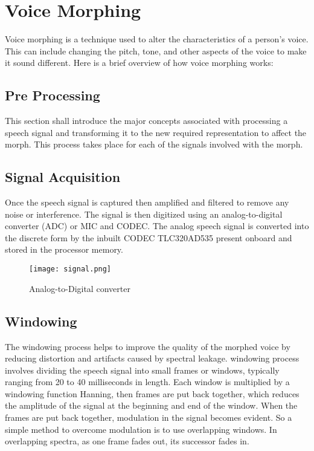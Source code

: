 \documentclass[12pt]{report}
\begin{document}
\section{Voice Morphing}
Voice morphing is a technique used to alter the characteristics of a person's voice. This can include 
changing the pitch, tone, and other aspects of the voice to make it sound different. Here is a brief overview of how voice morphing works:

\subsection{ Pre Processing}
This  section  shall  introduce  the  major  concepts  associated  with  processing  a  speech  signal  and transforming it to the new required representation to affect the morph. This process takes place for each of the signals involved with the morph.
\newline

\subsection{ Signal Acquisition}

Once the speech signal is captured then  amplified and filtered to remove any noise or interference. The signal is then digitized using an analog-to-digital converter (ADC) or MIC and CODEC. The analog speech signal is converted into the discrete form by the inbuilt CODEC TLC320AD535 present onboard and stored in the processor memory.

\begin{figure}[h!]
\begin{center}
  \texttt{[image: signal.png]}
  \caption{Analog-to-Digital converter}
  \label{fig:is}
\end{center}
\end{figure}

\subsection{ Windowing}


The windowing process helps to improve the quality of the morphed voice by reducing distortion and artifacts caused by spectral leakage. 
windowing process involves dividing the speech signal into small frames or windows, typically ranging from 20 to 40 milliseconds in length. Each window is multiplied by a windowing function Hanning, then frames are put back together, which reduces the amplitude of the signal at the beginning and end of the window.
\newline
           When the frames are put back together, modulation in the signal becomes evident. So a simple method to overcome modulation is to use overlapping windows. In overlapping spectra, as one frame fades out, its successor fades in.
\end{document}
